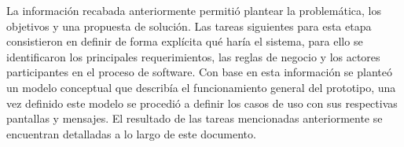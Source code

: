 

La información recabada anteriormente permitió plantear la problemática, los objetivos y una propuesta de solución. Las tareas siguientes para esta etapa consistieron en definir de forma explícita qué haría el sistema, para ello se identificaron los principales requerimientos, las reglas de negocio y los actores participantes en el proceso de software. Con base en esta información se planteó un modelo conceptual que describía el funcionamiento general del prototipo, una vez definido este modelo se procedió a definir los casos de uso con sus respectivas pantallas y mensajes. El resultado de las tareas mencionadas anteriormente se encuentran detalladas a lo largo de este documento.
